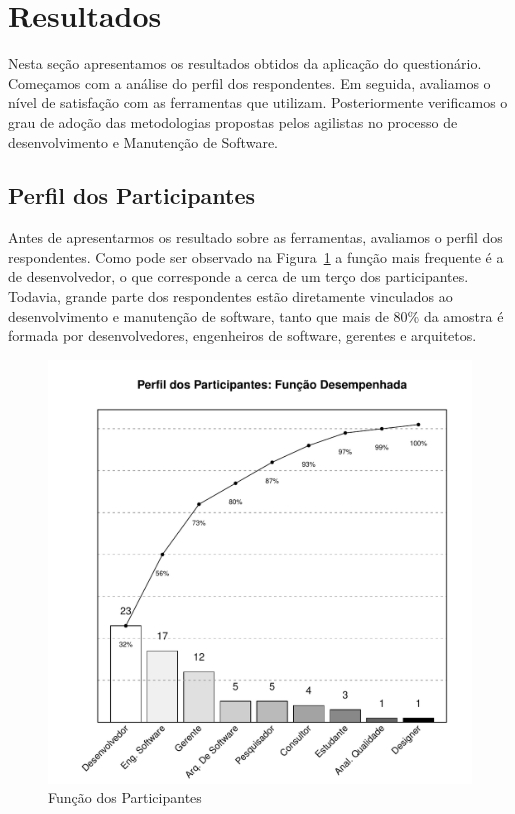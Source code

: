 
\section{Resultados}
\label{sec:analise_dados}

Nesta seção apresentamos os resultados obtidos da aplicação do questionário.
Começamos com a análise do perfil dos respondentes. Em seguida, avaliamos o
nível de satisfação com as ferramentas que utilizam. Posteriormente verificamos
o grau de adoção das metodologias propostas pelos agilistas no processo de
desenvolvimento e Manutenção de Software.

\subsection{Perfil dos Participantes}
\label{sub:pesquisa_prof_perfil_dos_participantes}

Antes de apresentarmos os resultado sobre as ferramentas, avaliamos o perfil dos
respondentes. Como pode ser observado na
Figura~\ref{fig:grafico_melhorias_fgrm_funcao_particantes} a função mais
frequente é a de desenvolvedor, o que corresponde a cerca de um terço dos
participantes. Todavia, grande parte dos respondentes estão diretamente
vinculados ao desenvolvimento e manutenção de software, tanto que mais de 80\%
da amostra é formada por desenvolvedores, engenheiros de software, gerentes e
arquitetos.

\begin{figure}[htpb]
	\centering
	\includegraphics[width=0.5\linewidth]{./chapter-pesquisa-com-profissionais/img/grafico_melhoria_fgrm_funcao_participantes.pdf}
	\caption{Função dos Participantes}
\label{fig:grafico_melhorias_fgrm_funcao_particantes}
\end{figure}

